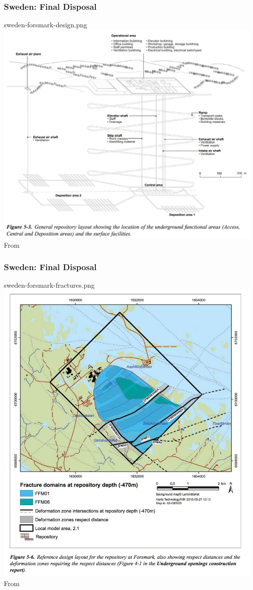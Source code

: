 \begin{frame}[c]
\frametitle{Sweden: Final Disposal}
sweden-forsmark-design.png
\includegraphics[width=\textwidth]{./images/sweden-forsmark-design}
From \cite{skb_long-term_2011}
\end{frame}

\begin{frame}[c]
\frametitle{Sweden: Final Disposal}
sweden-forsmark-fractures.png
\includegraphics[width=\textwidth]{./images/sweden-forsmark-fractures}
From \cite{skb_long-term_2011}
\end{frame}


